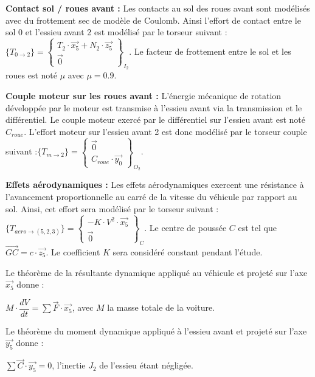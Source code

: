 \textbf{Contact sol / roues avant :} Les contacts au sol des roues avant sont modélisés avec du frottement sec de modèle de Coulomb. Ainsi l'effort de contact entre le sol 0 et l'essieu avant 2 est modélisé par le torseur suivant :$\{T_{0\to 2}\} = \left\{\begin{array}{c} T_2\cdot\overrightarrow{x_5} + N_2\cdot\overrightarrow{z_5} \\ \overrightarrow{0} \end{array}\right\}_{I_2}$. Le facteur de frottement entre le sol et les roues est noté $\mu$ avec $\mu = 0.9$.

\textbf{Couple moteur sur les roues avant :} L'énergie mécanique de rotation développée par le moteur est transmise à l'essieu avant via la transmission et le différentiel. Le couple moteur exercé par le différentiel sur l'essieu avant est noté $C_{roue}$. L'effort moteur sur l'essieu avant 2 est donc modélisé par le torseur couple suivant :$\{T_{m\to 2}\} = \left\{\begin{array}{c} \overrightarrow{0} \\ C_{roue}\cdot\overrightarrow{y_0} \end{array}\right\}_{O_2}$.

\textbf{Effets aérodynamiques :} Les effets aérodynamiques exercent une résistance à l'avancement proportionnelle au carré de la vitesse du véhicule par rapport au sol. Ainsi, cet effort sera modélisé par le torseur suivant :
$\{T_{aero\to(5,2,3)}\} = \left\{\begin{array}{c} -K\cdot V^2\cdot\overrightarrow{x_5} \\ \overrightarrow{0} \end{array}\right\}_{C}$. Le centre de poussée $C$ est tel que $\overrightarrow{GC} = c\cdot\overrightarrow{z_5}$. Le coefficient $K$ sera considéré constant pendant l'étude.

\medskip
Le théorème de la résultante dynamique appliqué au véhicule et projeté sur l'axe $\vec{x_5}$ donne :

\begin{center}
$M\cdot\dfrac{dV}{dt}=\sum \vec{F}\cdot \vec{x_5}$, avec $M$ la masse totale de la voiture.
\end{center}

\medskip
Le théorème du moment dynamique appliqué à l'essieu avant et projeté sur l'axe $\vec{y_5}$ donne :

\begin{center}
$\sum \vec{C}\cdot \vec{y_5}=0$, l'inertie $J_2$ de l'essieu étant négligée.
\end{center}

